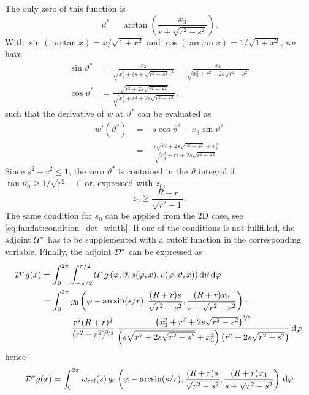 \documentclass{amsart}
\renewcommand*{\phi}{\varphi}
\begin{document}
The only zero of this function is
%
\begin{equation*}
 \vartheta^* = \arctan\left( \frac{x_3}{s + \sqrt{r^2 - s^2}} \right).
\end{equation*}
%
With $\sin(\arctan x) = x/\sqrt{1+x^2}$ and $\cos(\arctan x) = 1/\sqrt{1+x^2}$, we have
%
\begin{align*}
 \sin\vartheta^* &= \frac{x_3}{\sqrt{x_3^2 + \big(s + \sqrt{r^2-s^2}\big)^2}} = \frac{x_3}{\sqrt{x_3^2 + r^2 + 2s\sqrt{r^2-s^2}}} \\
 \cos\vartheta^* &= \frac{\sqrt{r^2 + 2s\sqrt{r^2-s^2}}}{\sqrt{x_3^2 + r^2 + 2s\sqrt{r^2-s^2}}},
\end{align*}
%
such that the derivative of $w$ at $\vartheta^*$ can be evaluated as
%
\begin{align*}
 w'(\vartheta^*) 
 &= -s \cos\vartheta^* - x_3 \sin\vartheta^* \\
 &= - \frac{s \sqrt{r^2 + 2s\sqrt{r^2-s^2}} + x_3^2}{\sqrt{x_3^2 + r^2 + 2s\sqrt{r^2-s^2}}}
\end{align*}
%
Since $s^2+v^2 \leq 1$, the zero $\vartheta^*$ is contained in the $\vartheta$ integral if $\tan\vartheta_0 \geq 1/\sqrt{r^2-1}$ or, 
expressed with $z_0$,
%
\begin{equation}
 \label{eq:coneflat:condition_det_height}
 z_0 \geq \frac{R+r}{\sqrt{r^2-1}}.
\end{equation}
%
The same condition for $s_0$ can be applied from the 2D case, see \eqref{eq:fanflat:condition_det_width}. If one of the conditions is not 
fullfilled, the adjoint ${\mathcal{U}}^*$ has to be supplemented with a cutoff function in the corresponding variable. Finally, the adjoint ${\mathcal{D}}^*$ 
can be expressed as
%
\begin{align*}
 \OPD^* g(x)
 &= \int_0^{2\pi} \int_{-\pi/2}^{\pi/2} \OPU^* g\left( \phi, \vartheta, s(\phi,x), v(\phi,\vartheta, x) \right) \D\vartheta\, \D\phi \\
 &= \int_0^{2\pi} g_0 \left( \phi - \arcsin(s/r), \frac{(R+r)s}{\sqrt{r^2-s^2}}, 
 \frac{(R+r)x_3}{s + \sqrt{r^2-s^2}} \right) \cdot \phantom{x} \\ 
 &\hspace{35pt} \frac{r^2(R+r)^2}{(r^2-s^2)^{\nicefrac{3}{2}}}\, 
 \frac{\big(x_3^2 + r^2 + 2s\sqrt{r^2-s^2}\big)^{\nicefrac{3}{2}}}{\left( s \sqrt{r^2 + 2s\sqrt{r^2-s^2}} + x_3^2 \right)
 \left( r^2 + 2s\sqrt{r^2-s^2} \right)}\, \D\phi,
\end{align*}
%
hence
%
\begin{equation}
 \label{eq:coneflat:backproj}
 \OPD^* g(x) = \int_0^{2\pi} w_{\text{ccf}}(s)\, g_0 \left( \phi - \arcsin(s/r), \frac{(R+r)s}{\sqrt{r^2-s^2}}, 
 \frac{(R+r)x_3}{s + \sqrt{r^2-s^2}} \right)\, \D\phi
\end{equation} 
\end{document}
